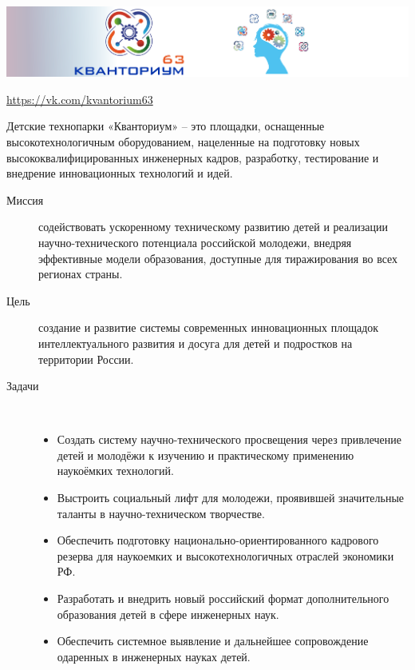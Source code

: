 \noindent\includegraphics[width=\textwidth]{img/logo63.png}

\url{https://vk.com/kvantorium63}


\noindent
Детские технопарки «Кванториум» – это площадки, оснащенные высокотехнологичным
оборудованием, нацеленные на подготовку новых высококвалифицированных инженерных
кадров, разработку, тестирование и внедрение инновационных технологий и идей.

\clearpage

\begin{description}

\item[Миссия] содействовать ускоренному техническому развитию детей и реализации
научно-технического потенциала российской молодежи, внедряя эффективные модели
образования, доступные для тиражирования во всех регионах страны.

\item[Цель] создание и развитие системы современных инновационных площадок
интеллектуального развития и досуга для детей и подростков на территории России.

\clearpage
\item[Задачи]\ \\

\begin{itemize}[nosep]
  \item 
Создать систему научно-технического просвещения через привлечение детей и
молодёжи к изучению и практическому применению наукоёмких технологий.
  \item 
Выстроить социальный лифт для молодежи, проявившей значительные таланты в
научно-техническом творчестве.
  \item 
Обеспечить подготовку национально-ориентированного кадрового резерва для
наукоемких и высокотехнологичных отраслей экономики РФ.
  \item 
Разработать и внедрить новый российский формат дополнительного образования детей
в сфере инженерных наук.
  \item 
Обеспечить системное выявление и дальнейшее сопровождение одаренных в инженерных
науках детей.
\end{itemize}
 
\end{description}